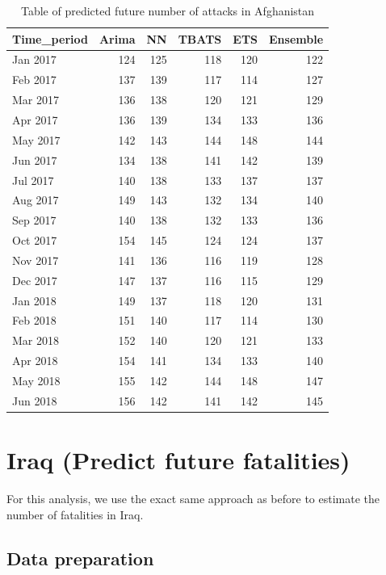 \documentclass[11pt,oneside,a4paper]{reedthesis}
\begin{document}
\begin{table}[H]

\caption{\label{tab:unnamed-chunk-84}Table of predicted future number of attacks in Afghanistan}
\centering
\begin{tabular}[t]{lrrrrr}
\toprule
Time\_period & Arima & NN & TBATS & ETS & Ensemble\\
\midrule
Jan 2017 & 124 & 125 & 118 & 120 & 122\\
Feb 2017 & 137 & 139 & 117 & 114 & 127\\
Mar 2017 & 136 & 138 & 120 & 121 & 129\\
Apr 2017 & 136 & 139 & 134 & 133 & 136\\
May 2017 & 142 & 143 & 144 & 148 & 144\\
\addlinespace
Jun 2017 & 134 & 138 & 141 & 142 & 139\\
Jul 2017 & 140 & 138 & 133 & 137 & 137\\
Aug 2017 & 149 & 143 & 132 & 134 & 140\\
Sep 2017 & 140 & 138 & 132 & 133 & 136\\
Oct 2017 & 154 & 145 & 124 & 124 & 137\\
\addlinespace
Nov 2017 & 141 & 136 & 116 & 119 & 128\\
Dec 2017 & 147 & 137 & 116 & 115 & 129\\
Jan 2018 & 149 & 137 & 118 & 120 & 131\\
Feb 2018 & 151 & 140 & 117 & 114 & 130\\
Mar 2018 & 152 & 140 & 120 & 121 & 133\\
\addlinespace
Apr 2018 & 154 & 141 & 134 & 133 & 140\\
May 2018 & 155 & 142 & 144 & 148 & 147\\
Jun 2018 & 156 & 142 & 141 & 142 & 145\\
\bottomrule
\end{tabular}
\end{table}
\section{Iraq (Predict future
fatalities)}\label{iraq-predict-future-fatalities}

For this analysis, we use the exact same approach as before to estimate
the number of fatalities in Iraq.

\subsection{Data preparation}\label{data-preparation-4}
\end{document}
